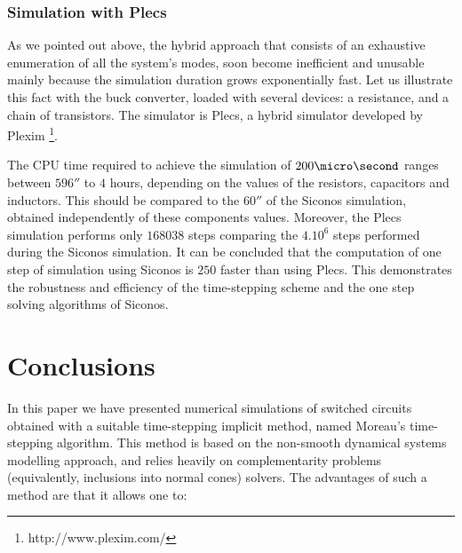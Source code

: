 \subsubsection{Simulation with {\sc Plecs}}

As we pointed out above, the hybrid approach that consists of an exhaustive enumeration of all the
system's modes, soon become inefficient and unusable mainly because the simulation duration grows
exponentially fast. Let us illustrate this fact with the buck converter, loaded with several
devices: a resistance, and a chain of transistors. The simulator is {\sc Plecs}, a hybrid simulator developed by Plexim \footnote{http://www.plexim.com/}. 

The CPU time required to achieve the simulation of $200 \micro\second$ ranges between $596 \second$ to $4$ hours,
depending on the values of the resistors, capacitors and inductors. This should be compared to the
$60\second$ of the {\sc Siconos} simulation, obtained independently of these components values.
Moreover, the {\sc Plecs} simulation performs only $168038$ steps comparing the $4.10^{6}$ steps performed during the {\sc Siconos}
simulation. It can be concluded that the computation of one step of simulation using {\sc Siconos} is $250$
faster than using {\sc Plecs}. This demonstrates the robustness and efficiency of the time-stepping scheme
and the one step solving algorithms of {\sc Siconos}.


\section{Conclusions}
\label{section5}


In this paper we have presented numerical simulations of switched circuits obtained with a suitable time-stepping implicit method, named Moreau's time-stepping algorithm. This method is based on the non-smooth dynamical systems modelling approach, and relies heavily on complementarity problems (equivalently, inclusions into normal cones) solvers. The advantages of such a method are that it allows one to:

